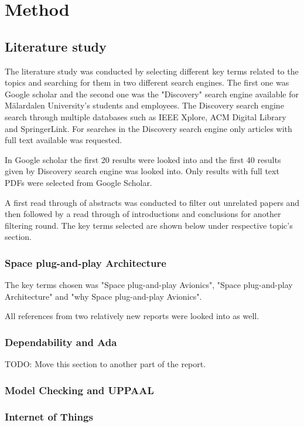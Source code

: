 \chapter{Method}\label{ch:method}
\section{Literature study}
The literature study was conducted by selecting different key terms related to
the topics and searching for them in two different search engines. The first
one was Google scholar and the second one was the "Discovery" search engine
available for Mälardalen University's students and employees. The Discovery
search engine search through multiple databases such as IEEE Xplore,
ACM Digital Library and SpringerLink. For searches in the Discovery search
engine only articles with full text available was requested.

In Google scholar the first 20 results were looked into and the first 40
results given by Discovery search engine was looked into. Only results with
full text PDFs were selected from Google Scholar.

A first read through of abstracts was conducted to filter out unrelated
papers and then followed by a read through of introductions and conclusions for
another filtering round. The key terms selected are shown below under
respective topic's section.

\subsection{Space plug-and-play Architecture}
The key terms chosen was "Space plug-and-play Avionics", "Space
plug-and-play Architecture" and "why Space plug-and-play Avionics".

All references from two relatively new reports were looked into as well.


\subsection{Dependability and Ada}
TODO: Move this section to another part of the report.
\subsection{Model Checking and UPPAAL}
\subsection{Internet of Things}

